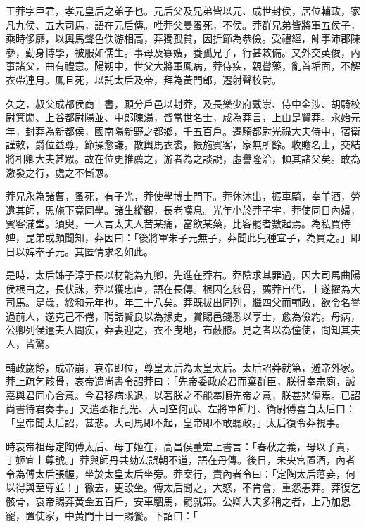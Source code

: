 
\begin{pinyinscope}
王莽字巨君，孝元皇后之弟子也。元后父及兄弟皆以元、成世封侯，居位輔政，家凡九侯、五大司馬，語在元后傳。唯莽父曼蚤死，不侯。莽群兄弟皆將軍五侯子，乘時侈靡，以輿馬聲色佚游相高，莽獨孤貧，因折節為恭儉。受禮經，師事沛郡陳參，勤身博學，被服如儒生。事母及寡嫂，養孤兄子，行甚敕備。又外交英俊，內事諸父，曲有禮意。陽朔中，世父大將軍鳳病，莽侍疾，親嘗藥，亂首垢面，不解衣帶連月。鳳且死，以託太后及帝，拜為黃門郎，遷射聲校尉。

久之，叔父成都侯商上書，願分戶邑以封莽，及長樂少府戴崇、侍中金涉、胡騎校尉箕閎、上谷都尉陽並、中郎陳湯，皆當世名士，咸為莽言，上由是賢莽。永始元年，封莽為新都侯，國南陽新野之都鄉，千五百戶。遷騎都尉光祿大夫侍中，宿衛謹敕，爵位益尊，節操愈謙。散輿馬衣裘，振施賓客，家無所餘。收贍名士，交結將相卿大夫甚眾。故在位更推薦之，游者為之談說，虛譽隆洽，傾其諸父矣。敢為激發之行，處之不慚恧。

莽兄永為諸曹，蚤死，有子光，莽使學博士門下。莽休沐出，振車騎，奉羊酒，勞遺其師，恩施下竟同學。諸生縱觀，長老嘆息。光年小於莽子宇，莽使同日內婦，賓客滿堂。須臾，一人言太夫人苦某痛，當飲某藥，比客罷者數起焉。為私買侍婢，昆弟或頗聞知，莽因曰：「後將軍朱子元無子，莽聞此兒種宜子，為買之。」即日以婢奉子元。其匿情求名如此。

是時，太后姊子淳于長以材能為九卿，先進在莽右。莽陰求其罪過，因大司馬曲陽侯根白之，長伏誅，莽以獲忠直，語在長傳。根因乞骸骨，薦莽自代，上遂擢為大司馬。是歲，綏和元年也，年三十八矣。莽既拔出同列，繼四父而輔政，欲令名譽過前人，遂克己不倦，聘諸賢良以為掾史，賞賜邑錢悉以享士，愈為儉約。母病，公卿列侯遣夫人問疾，莽妻迎之，衣不曳地，布蔽膝。見之者以為僮使，問知其夫人，皆驚。

輔政歲餘，成帝崩，哀帝即位，尊皇太后為太皇太后。太后詔莽就第，避帝外家。莽上疏乞骸骨，哀帝遣尚書令詔莽曰：「先帝委政於君而棄群臣，朕得奉宗廟，誠嘉與君同心合意。今君移病求退，以著朕之不能奉順先帝之意，朕甚悲傷焉。已詔尚書待君奏事。」又遣丞相孔光、大司空何武、左將軍師丹、衛尉傅喜白太后曰：「皇帝聞太后詔，甚悲。大司馬即不起，皇帝即不敢聽政。」太后復令莽視事。

時哀帝祖母定陶傅太后、母丁姬在，高昌侯董宏上書言：「春秋之義，母以子貴，丁姬宜上尊號。」莽與師丹共劾宏誤朝不道，語在丹傳。後日，未央宮置酒，內者令為傅太后張幄，坐於太皇太后坐旁。莽案行，責內者令曰：「定陶太后藩妾，何以得與至尊並！」徹去，更設坐。傅太后聞之，大怒，不肯會，重怨恚莽。莽復乞骸骨，哀帝賜莽黃金五百斤，安車駟馬，罷就第。公卿大夫多稱之者，上乃加恩寵，置使家，中黃門十日一賜餐。下詔曰：「


\end{pinyinscope}
